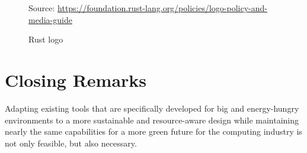 \begin{figure} %
  \centering
  \def\stackalignment{r} %
  {\scriptsize \parbox[t]{\linewidth}{ Source: \url{https://foundation.rust-lang.org/policies/logo-policy-and-media-guide}} }
  \caption{Rust logo}
\end{figure}

\section{Closing Remarks}
\label{sec:conclusions_closing_remarks}

Adapting existing tools that are specifically developed for big and energy-hungry
environments to a more sustainable and resource-aware design while maintaining
nearly the same capabilities for a more green future for the computing industry
is not only feasible, but also necessary.